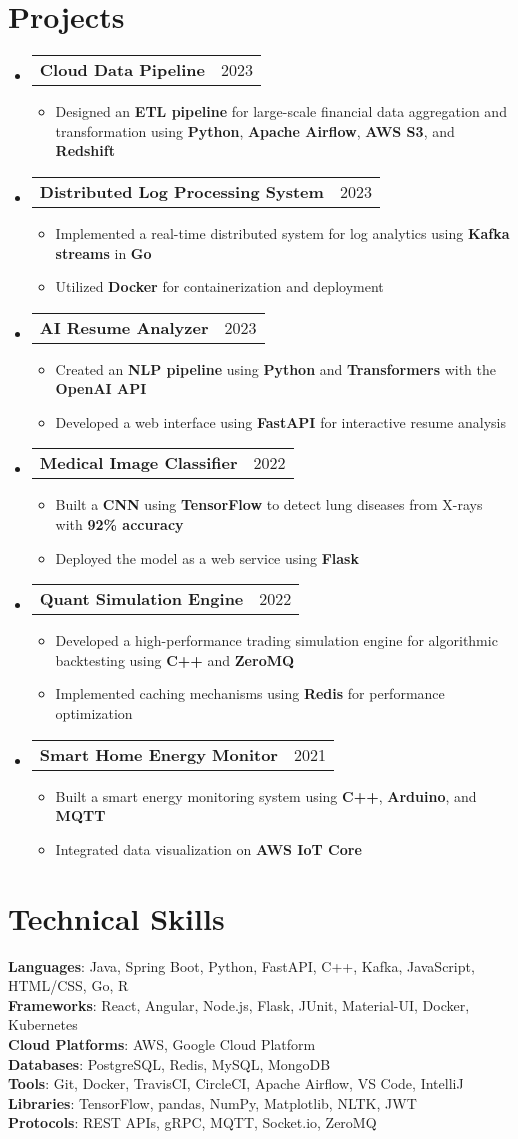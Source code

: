 \documentclass[letterpaper,11pt]{article}
\makeatletter
\newcommand{\resumeItem}[1]{
    \item\small{
            {#1 \vspace{-2pt}}
    }
}
\newcommand{\resumeProjectHeading}[2]{
    \item
    \begin{tabular*}{0.97\textwidth}{l@{\extracolsep{\fill}}r}
    \small#1 & #2 \\
    \end{tabular*}\vspace{-7pt}
}
\newcommand{\resumeSubHeadingListStart}{\begin{itemize}[leftmargin=0.15in, label={}]}
\newcommand{\resumeSubHeadingListEnd}{\end{itemize}}
\newcommand{\resumeItemListStart}{\begin{itemize}}
\newcommand{\resumeItemListEnd}{\end{itemize}\vspace{-5pt}}
\makeatother
\begin{document}
\section{Projects}
\resumeSubHeadingListStart
\resumeProjectHeading
{\textbf{Cloud Data Pipeline}}{2023}
\resumeItemListStart
\resumeItem{Designed an \textbf{ETL pipeline} for large-scale financial data aggregation and transformation using \textbf{Python}, \textbf{Apache Airflow}, \textbf{AWS S3}, and \textbf{Redshift}}
\resumeItemListEnd
\resumeProjectHeading
{\textbf{Distributed Log Processing System}}{2023}
\resumeItemListStart
\resumeItem{Implemented a real-time distributed system for log analytics using \textbf{Kafka streams} in \textbf{Go}}
\resumeItem{Utilized \textbf{Docker} for containerization and deployment}
\resumeItemListEnd
\resumeProjectHeading
{\textbf{AI Resume Analyzer}}{2023}
\resumeItemListStart
\resumeItem{Created an \textbf{NLP pipeline} using \textbf{Python} and \textbf{Transformers} with the \textbf{OpenAI API}}
\resumeItem{Developed a web interface using \textbf{FastAPI} for interactive resume analysis}
\resumeItemListEnd
\resumeProjectHeading
{\textbf{Medical Image Classifier}}{2022}
\resumeItemListStart
\resumeItem{Built a \textbf{CNN} using \textbf{TensorFlow} to detect lung diseases from X-rays with \textbf{92\% accuracy}}
\resumeItem{Deployed the model as a web service using \textbf{Flask}}
\resumeItemListEnd
\resumeProjectHeading
{\textbf{Quant Simulation Engine}}{2022}
\resumeItemListStart
\resumeItem{Developed a high-performance trading simulation engine for algorithmic backtesting using \textbf{C++} and \textbf{ZeroMQ}}
\resumeItem{Implemented caching mechanisms using \textbf{Redis} for performance optimization}
\resumeItemListEnd
\resumeProjectHeading
{\textbf{Smart Home Energy Monitor}}{2021}
\resumeItemListStart
\resumeItem{Built a smart energy monitoring system using \textbf{C++}, \textbf{Arduino}, and \textbf{MQTT}}
\resumeItem{Integrated data visualization on \textbf{AWS IoT Core}}
\resumeItemListEnd
\resumeSubHeadingListEnd

\section{Technical Skills}
\begin{itemize}[leftmargin=0.15in, label={}]
\small{\item{
\textbf{Languages}{: Java, Spring Boot, Python, FastAPI, C++, Kafka, JavaScript, HTML/CSS, Go, R} \\
\textbf{Frameworks}{: React, Angular, Node.js, Flask, JUnit, Material-UI, Docker, Kubernetes} \\
\textbf{Cloud Platforms}{: AWS, Google Cloud Platform} \\
\textbf{Databases}{: PostgreSQL, Redis, MySQL, MongoDB} \\
\textbf{Tools}{: Git, Docker, TravisCI, CircleCI, Apache Airflow, VS Code, IntelliJ} \\
\textbf{Libraries}{: TensorFlow, pandas, NumPy, Matplotlib, NLTK, JWT} \\
\textbf{Protocols}{: REST APIs, gRPC, MQTT, Socket.io, ZeroMQ} \\
}}
\end{itemize}
\end{document}
